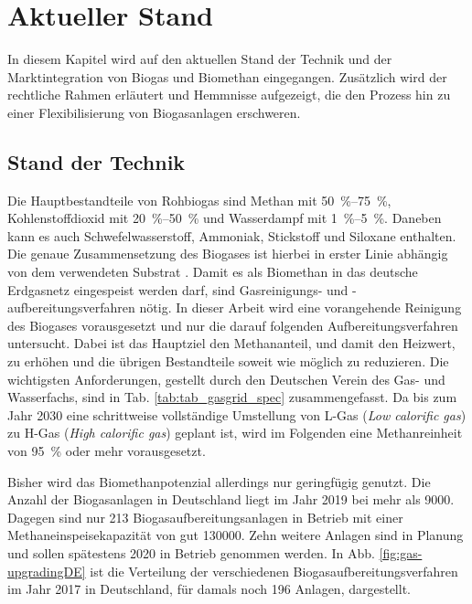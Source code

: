 \section{Aktueller Stand}
In diesem Kapitel wird auf den aktuellen Stand der Technik und der Marktintegration von Biogas und Biomethan eingegangen. Zusätzlich wird der rechtliche Rahmen erläutert und Hemmnisse aufgezeigt, die den Prozess hin zu einer Flexibilisierung von Biogasanlagen erschweren.


\subsection{Stand der Technik}\label{chap:stateofart}

Die Hauptbestandteile von Rohbiogas sind Methan mit \SIrange{50}{75}{\percent}, Kohlenstoffdioxid mit \SIrange{20}{50}{\percent} und Wasserdampf mit \SIrange{1}{5}{\percent}. Daneben kann es auch Schwefelwasserstoff, Ammoniak, Stickstoff und Siloxane enthalten. Die genaue Zusammensetzung des Biogases ist hierbei in erster Linie abhängig von dem verwendeten Substrat \parencite{Rasi09}. Damit es als Biomethan in das deutsche Erdgasnetz eingespeist werden darf, sind Gasreinigungs- und -aufbereitungsverfahren nötig. In dieser Arbeit wird eine vorangehende Reinigung des Biogases vorausgesetzt und nur die darauf folgenden Aufbereitungsverfahren untersucht. Dabei ist das Hauptziel den Methananteil, und damit den Heizwert, zu erhöhen und die übrigen Bestandteile soweit wie möglich zu reduzieren. Die wichtigsten Anforderungen, gestellt durch den Deutschen Verein des Gas- und Wasserfachs, sind in Tab. \ref{tab:tab_gasgrid_spec} zusammengefasst. Da bis zum Jahr \SI{2030}{\relax} eine schrittweise vollständige Umstellung von L-Gas (\textit{Low calorific gas}) zu H-Gas (\textit{High calorific gas}) geplant ist, wird im Folgenden eine Methanreinheit von \SI{95}{\percent} oder mehr vorausgesetzt. \parencite{FNR14} \parencite{Gas20} \parencite{KoBi16}



Bisher wird das Biomethanpotenzial allerdings nur geringfügig genutzt. Die Anzahl der Biogasanlagen in Deutschland liegt im Jahr \SI{2019}{\relax} bei mehr als \SI{9000}{\relax}. Dagegen sind nur \SI{213}{\relax} Biogasaufbereitungsanlagen in Betrieb mit einer Methaneinspeisekapazität von gut \SI{130000}{\normvolh}. Zehn weitere Anlagen sind in Planung und sollen spätestens \SI{2020}{\relax} in Betrieb genommen werden. In Abb. \ref{fig:gas-upgradingDE} ist die Verteilung der verschiedenen Biogasaufbereitungsverfahren im Jahr \SI{2017}{\relax} in Deutschland, für damals noch \SI{196}{\relax} Anlagen, dargestellt. \parencite{FaBio19} \parencite{dena19}

